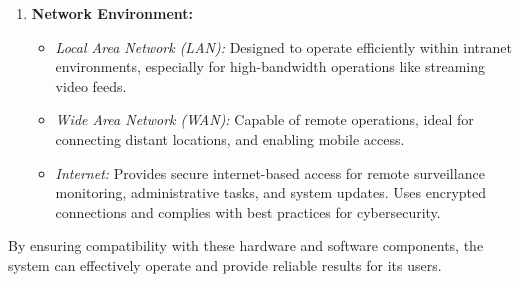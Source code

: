 \begin{enumerate}
\begin{itemize}
                \end{itemize}
            \item \textbf{Network Environment: }
                \begin{itemize}
                    \item \textit{Local Area Network (LAN):} Designed to operate efficiently within intranet environments, especially for high-bandwidth operations like streaming video feeds.
                    \item \textit{Wide Area Network (WAN):} Capable of remote operations, ideal for connecting distant locations, and enabling mobile access.
                    \item \textit{Internet:} Provides secure internet-based access for remote surveillance monitoring, administrative tasks, and system updates. Uses encrypted connections and complies with best practices for cybersecurity.
                \end{itemize}
        \end{enumerate}
        By ensuring compatibility with these hardware and software components, the system can effectively operate and provide reliable results for its users.
    
    
